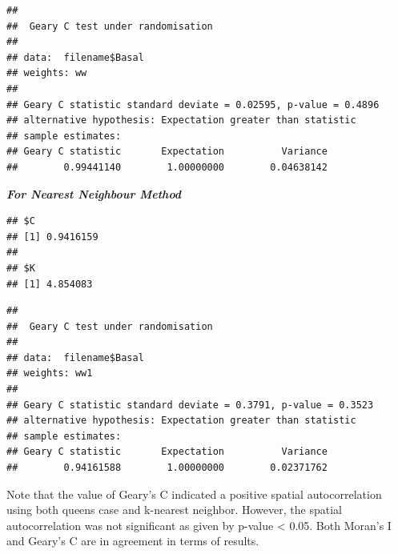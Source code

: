 \documentclass[
]{book}
\newenvironment{Shaded}{\begin{snugshade}}{\end{snugshade}}
\newcommand{\AttributeTok}[1]{\textcolor[rgb]{0.77,0.63,0.00}{#1}}
\newcommand{\DecValTok}[1]{\textcolor[rgb]{0.00,0.00,0.81}{#1}}
\newcommand{\DocumentationTok}[1]{\textcolor[rgb]{0.56,0.35,0.01}{\textbf{\textit{#1}}}}
\newcommand{\FunctionTok}[1]{\textcolor[rgb]{0.00,0.00,0.00}{#1}}
\newcommand{\NormalTok}[1]{#1}
\newcommand{\SpecialCharTok}[1]{\textcolor[rgb]{0.00,0.00,0.00}{#1}}
\begin{document}
\begin{verbatim}
## 
##  Geary C test under randomisation
## 
## data:  filename$Basal 
## weights: ww 
## 
## Geary C statistic standard deviate = 0.02595, p-value = 0.4896
## alternative hypothesis: Expectation greater than statistic
## sample estimates:
## Geary C statistic       Expectation          Variance 
##        0.99441140        1.00000000        0.04638142
\end{verbatim}

\textbf{\emph{For Nearest Neighbour Method}}

\begin{Shaded}
\end{Shaded}

\begin{verbatim}
## $C
## [1] 0.9416159
## 
## $K
## [1] 4.854083
\end{verbatim}

\begin{Shaded}
\end{Shaded}

\begin{verbatim}
## 
##  Geary C test under randomisation
## 
## data:  filename$Basal 
## weights: ww1 
## 
## Geary C statistic standard deviate = 0.3791, p-value = 0.3523
## alternative hypothesis: Expectation greater than statistic
## sample estimates:
## Geary C statistic       Expectation          Variance 
##        0.94161588        1.00000000        0.02371762
\end{verbatim}

Note that the value of Geary's C indicated a positive spatial autocorrelation using both queens case and k-nearest neighbor. However, the spatial autocorrelation was not significant as given by p-value \textless{} 0.05. Both Moran's I and Geary's C are in agreement in terms of results.
\end{document}
